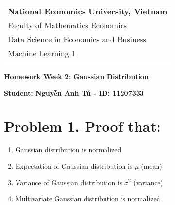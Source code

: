 \documentclass[a4paper, 10pt]{article}  %
\begin{document}
\thispagestyle{empty} %

\begin{tabular}{p{12.5cm}} %
{\large \bf National Economics University, Vietnam} \\
Faculty of Mathematics Economics \\ Data Science in Economics and Business  \\ Machine Learning 1\\
\hline %
\\
\end{tabular} %

\vspace*{0.3cm} %

\begin{center} %
	{\Large \bf Homework Week 2: Gaussian Distribution} %
	\vspace{2mm}
	
	{\bf Student: Nguyễn Anh Tú - ID: 11207333} %
\end{center}  

\vspace{0.4cm}

\section{Problem 1. Proof that:}
\begin{enumerate}[label=(\alph*)]
    \item Gaussian distribution is normalized
    \item Expectation of Gaussian distribution is $\mu$ (mean)
    \item Variance of Gaussian distribution is $\sigma^2$ (variance)
    \item Multivariate Gaussian distribution is normalized
\end{enumerate}
\end{document}
